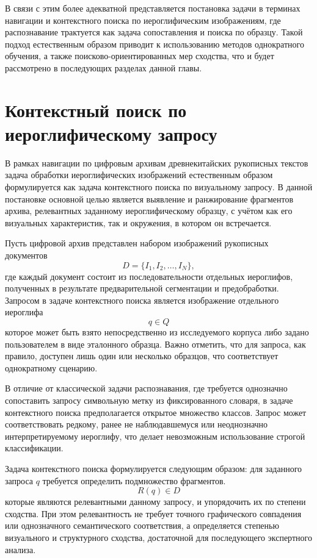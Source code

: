 В связи с этим более адекватной представляется постановка задачи в терминах навигации и контекстного поиска по иероглифическим изображениям, где распознавание трактуется как задача сопоставления и поиска по образцу. Такой подход естественным образом приводит к использованию методов однократного обучения, а также поисково-ориентированных мер сходства, что и будет рассмотрено в последующих разделах данной главы.

\section{Контекстный поиск по иероглифическому запросу}\label{sec:ch2/sec2}
В рамках навигации по цифровым архивам древнекитайских рукописных текстов задача обработки иероглифических изображений естественным образом формулируется как задача контекстного поиска по визуальному запросу. В данной постановке основной целью является выявление и ранжирование фрагментов архива, релевантных заданному иероглифическому образцу, с учётом как его визуальных характеристик, так и окружения, в котором он встречается.

Пусть цифровой архив представлен набором изображений рукописных документов
\[
    D = \{I_1, I_2, \ldots, I_N \},
\]
где каждый документ состоит из последовательности отдельных иероглифов, полученных в результате предварительной сегментации и предобработки. Запросом в задаче контекстного поиска является изображение отдельного иероглифа
\[
    q \in Q
\]
которое может быть взято непосредственно из исследуемого корпуса либо задано пользователем в виде эталонного образца. Важно отметить, что для запроса, как правило, доступен лишь один или несколько образцов, что соответствует однократному сценарию.

В отличие от классической задачи распознавания, где требуется однозначно сопоставить запросу символьную метку из фиксированного словаря, в задаче контекстного поиска предполагается открытое множество классов. Запрос может соответствовать редкому, ранее не наблюдавшемуся или неоднозначно интерпретируемому иероглифу, что делает невозможным использование строгой классификации.

Задача контекстного поиска формулируется следующим образом: для заданного запроса $q$ требуется определить подмножество фрагментов.
\[
    R(q) \in D
\]
которые являются релевантными данному запросу, и упорядочить их по степени сходства. При этом релевантность не требует точного графического совпадения или однозначного семантического соответствия, а определяется степенью визуального и структурного сходства, достаточной для последующего экспертного анализа.

